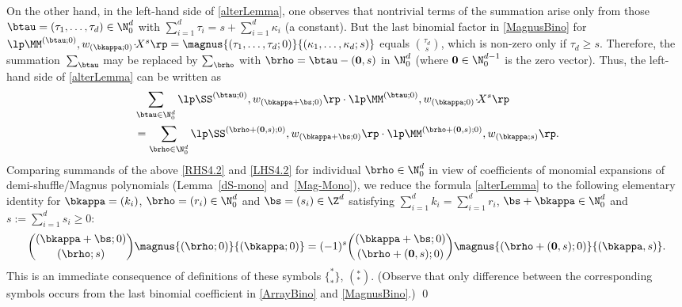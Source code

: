 \begin{Note}
On the other hand, in the left-hand side of  \eqref{alterLemma},
one observes that nontrivial terms of the summation arise
only from those $\btau=(\tau_1,\dots,\tau_d)\in\N_0^d$ with
$\sum_{i=1}^d \tau_i=s+\sum_{i=1}^d \kappa_i$ (a constant). 
But the last binomial factor in \eqref{MagnusBino} for
$ \lp\MM^{(\btau;0)}, w_{(\bkappa;0)}\!\cdot\!\! X^s\rp
=\magnus{(\tau_1,\dots,\tau_d;0)}{(\kappa_1,\dots,\kappa_d;s)}
$
equals $\binom{\tau_d}{s}$, which is non-zero only if
$\tau_d\ge s$.
Therefore, 
the summation~$\sum_\btau$ may be replaced by 
$\sum_\brho$ with $\brho=\btau-(\mathbf{0},s)$
in $\N_0^d$ (where $\mathbf{0}\in\N_0^{d-1}$ is the zero vector).
Thus,
the left-hand side of \eqref{alterLemma} can be written as
\begin{align}
\label{LHS4.2}
&\sum_{\btau\in\N_0^d} 
\lp\SS^{(\btau;0)},w_{(\bkappa+\bs;0)} \rp \cdot 
\lp\MM^{(\btau;0)}, w_{(\bkappa;0)}\!\cdot\!\! X^s\rp \\
&=
\sum_{\brho\in\N_0^d} 
\lp\SS^{(\brho+(\mathbf{0},s);0)},w_{(\bkappa+\bs;0)} \rp \cdot 
\lp\MM^{(\brho+(\mathbf{0},s);0)}, w_{(\bkappa;s)} \rp.
\notag
\end{align}
Comparing summands of the above \eqref{RHS4.2} and \eqref{LHS4.2} for 
individual $\brho\in\N_0^d$ in view of coefficients of 
monomial expansions of demi-shuffle/Magnus polynomials 
(Lemma~\ref{dS-mono} and~\eqref{Mag-Mono}), we reduce 
the formula \eqref{alterLemma} to the following elementary identity
for $\bkappa=(k_i)$, $\brho=(r_i)\in\N_0^d$ and $\bs=(s_i)\in\Z^d$
satisfying
$\sum_{i=1}^d k_i=\sum_{i=1}^d r_i$, $\bs+\bkappa\in \N_0^d$
and $s:=\sum_{i=1}^d s_i\ge 0$:
\begin{equation}
\binom{(\bkappa+\bs;0)}{(\brho;s)}
\magnus{(\brho;0)}{(\bkappa;0)}
=
(-1)^s
\binom{(\bkappa+\bs;0)}{(\brho+(\mathbf{0},s);0)}
\magnus{(\brho+(\mathbf{0},s);0)}{(\bkappa,s)}.
\end{equation} 
This is an immediate consequence of definitions
of these symbols $\{^*_* \}$, $(^*_*)$.
(Observe that only difference between the corresponding symbols
occurs from the last binomial coefficient in  \eqref{ArrayBino}
and \eqref{MagnusBino}.)
\qed
\end{Note}
